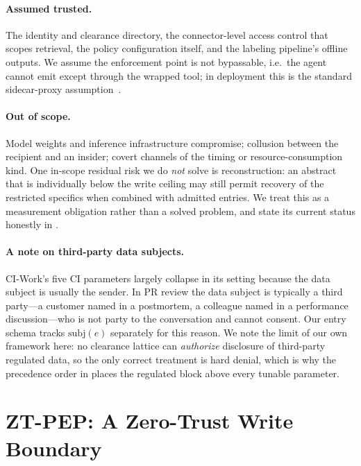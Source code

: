 \documentclass[conference,compsoc]{IEEEtran}
\newcommand{\sys}{ZT-PEP}                        %
\begin{document}
\paragraph{Assumed trusted.} The identity and clearance directory, the
connector-level access control that scopes retrieval, the policy configuration
itself, and the labeling pipeline's offline outputs. We assume the enforcement
point is not bypassable, i.e.\ the agent cannot emit except through the wrapped
tool; in deployment this is the standard sidecar-proxy
assumption~\cite{nist800207a}.

\paragraph{Out of scope.} Model weights and inference infrastructure
compromise; collusion between the recipient and an insider; covert channels of
the timing or resource-consumption kind. One in-scope residual risk we do
\emph{not} solve is reconstruction: an abstract that is individually below the
write ceiling may still permit recovery of the restricted specifics when
combined with admitted entries. We treat this as a measurement obligation
rather than a solved problem, and state its current status honestly in
.

\paragraph{A note on third-party data subjects.} CI-Work's five CI parameters
largely collapse in its setting because the data subject is usually the sender.
In PR review the data subject is typically a third party---a customer named in
a postmortem, a colleague named in a performance discussion---who is not party
to the conversation and cannot consent. Our entry schema tracks $\mathrm{subj}(e)$
separately for this reason. We note the limit of our own framework here: no
clearance lattice can \emph{authorize} disclosure of third-party regulated
data, so the only correct treatment is hard denial, which is why the precedence
order in  places the regulated block above every
tunable parameter.
\section{\sys: A Zero-Trust Write Boundary}
\label{sec:method}
\end{document}
